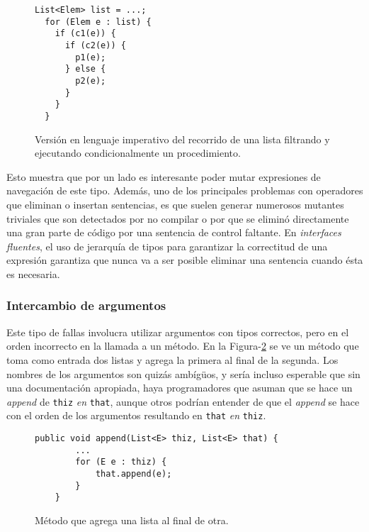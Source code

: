 \begin{figure}
	\begin{lstlisting}[frame=single, mathescape=true,framexleftmargin=1.5em]
  List<Elem> list = ...;
  for (Elem e : list) {
    if (c1(e)) {
      if (c2(e)) {
        p1(e);
      } else {
        p2(e);
      }
    }
  }
	\end{lstlisting}
	\label{figures.examples.fluent.example1.imperative}
	\caption{Versi\'on en lenguaje imperativo del recorrido de una lista filtrando y ejecutando condicionalmente un procedimiento.}
\end{figure}

Esto muestra que por un lado es interesante poder mutar expresiones de navegaci\'on de este tipo. Adem\'as, uno de los principales problemas con operadores que eliminan o insertan sentencias, es que suelen generar numerosos mutantes triviales que son detectados por no compilar o por que se elimin\'o directamente una gran parte de c\'odigo por una sentencia de control faltante. En \emph{interfaces fluentes}, el uso de jerarqu\'ia de tipos para garantizar la correctitud de una expresi\'on garantiza que nunca va a ser posible eliminar una sentencia cuando \'esta es necesaria.

\subsubsection{Intercambio de argumentos}

Este tipo de fallas involucra utilizar argumentos con tipos correctos, pero en el orden incorrecto en la llamada a un m\'etodo. En la Figura-\ref{figures.examples.argumentSwap.example1} se ve un m\'etodo que toma como entrada dos listas y agrega la primera al final de la segunda. Los nombres de los argumentos son quiz\'as amb\'ig\"{u}os, y ser\'ia incluso esperable que sin una documentaci\'on apropiada, haya programadores que asuman que se hace un \emph{append} de \texttt{thiz} \emph{en} \texttt{that}, aunque otros podr\'ian entender de que el \emph{append} se hace con el orden de los argumentos resultando en \texttt{that} \emph{en} \texttt{thiz}. 

\begin{figure}
	\begin{lstlisting}[frame=single, mathescape=true,framexleftmargin=1.5em]
	public void append(List<E> thiz, List<E> that) {
		...
		for (E e : thiz) {
			that.append(e);
		}
	}
	\end{lstlisting}
	\label{figures.examples.argumentSwap.example1}
	\caption{M\'etodo que agrega una lista al final de otra.}
\end{figure}

